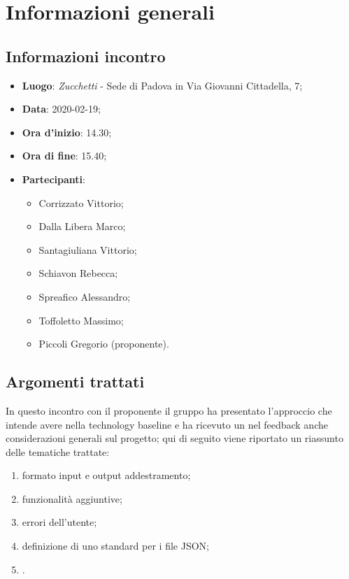 \section{Informazioni generali}
    \subsection{Informazioni incontro}
        \begin{itemize}
            \item \textbf{Luogo}: \textit{Zucchetti} - Sede di Padova in Via Giovanni Cittadella, 7;
            \item \textbf{Data}: 2020-02-19;
            \item \textbf{Ora d'inizio}: 14.30;
            \item \textbf{Ora di fine}: 15.40;
            \item \textbf{Partecipanti}: 
            \begin{itemize}
                \item Corrizzato Vittorio;
                \item Dalla Libera Marco;
                \item Santagiuliana Vittorio;
                \item Schiavon Rebecca;
                \item Spreafico Alessandro;
                \item Toffoletto Massimo;
                \item Piccoli Gregorio (proponente).
            \end{itemize}
        \end{itemize}
    \subsection{Argomenti trattati}
        In questo incontro con il proponente il gruppo ha presentato l'approccio che intende avere nella technology baseline e ha ricevuto un nel feedback anche considerazioni generali sul progetto; qui di seguito viene riportato un riassunto delle tematiche trattate:
        \begin{enumerate}
            \item formato input e output addestramento;
            \item funzionalità aggiuntive;
            \item errori dell'utente;
            \item definizione di uno standard per i file JSON;
            \item .
        \end{enumerate}

